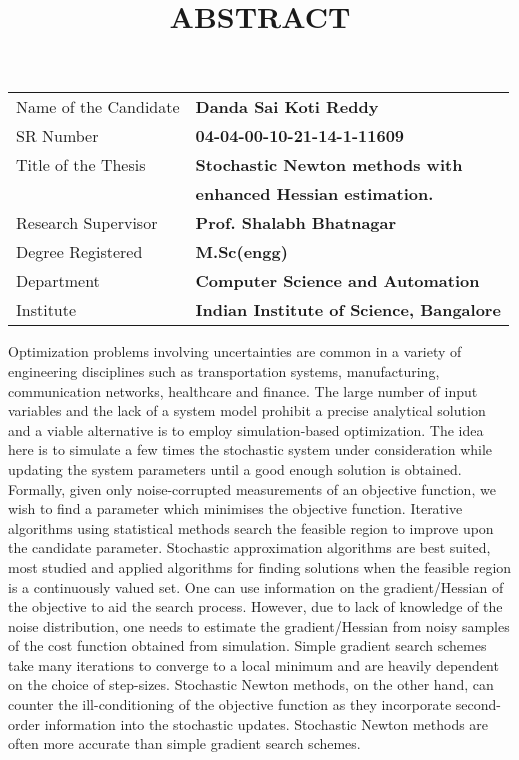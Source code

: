 \documentclass[12pt]{article}
\title{\textbf{ABSTRACT}}
\author{}
\date{}
\begin{document}
\maketitle
\begin{tabular}{ll}
Name of the Candidate & \textbf{Danda Sai Koti Reddy}\\ 
SR Number &\textbf{04-04-00-10-21-14-1-11609} \\
Title of the Thesis & \textbf{Stochastic Newton methods with   } \\
 & \textbf{ enhanced Hessian estimation.}\\
 Research Supervisor  & \textbf{Prof. Shalabh Bhatnagar} \\
Degree Registered  &  \textbf{M.Sc(engg)} \\
Department  & \textbf{Computer Science and Automation} \\
Institute  & \textbf{Indian Institute of Science, Bangalore }
\end{tabular}

\vspace{1.5cm}



Optimization problems involving uncertainties are common in a variety
of engineering disciplines such as transportation systems, manufacturing,
communication networks, healthcare and finance. The large number of input
variables and the lack of a system model prohibit a precise analytical
solution and a viable alternative is to employ simulation-based
optimization. The idea here is to simulate a few times the stochastic
system under consideration while updating the system parameters until a
good enough solution is obtained.\\


Formally, given only noise-corrupted measurements of an
objective function, we wish to find a parameter which minimises the
objective function. Iterative algorithms using statistical methods search
the feasible region to improve upon the candidate parameter. Stochastic
approximation algorithms are best suited, most studied and applied
algorithms for finding solutions when the feasible region is a
continuously valued set. One can use information on the gradient/Hessian
of the objective to aid the search process. However, due to lack of
knowledge of the noise distribution, one needs to estimate the
gradient/Hessian from noisy samples of the cost function obtained from
simulation. Simple gradient search schemes take many iterations to
converge to a local minimum and are heavily dependent on the choice of
step-sizes. Stochastic Newton methods, on the other hand, can counter the
ill-conditioning of the objective function as they incorporate
second-order information into the stochastic updates. Stochastic Newton
methods are often more accurate than simple gradient search schemes.\\
\end{document}
